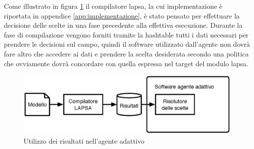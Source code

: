 Come illustrato in figura \ref{fig:lapsa:compiler2} il compilatore \ac{lapsa}, la cui implementazione è riportata in appendice \ref{app:implementazione}, è stato pensato per effettuare la decisione delle scelte in una fase precedente alla effettiva esecuzione. Durante la fase di compilazione vengono forniti tramite la hashtable tutti i dati necessari per prendere le decisioni sul campo, quindi il software utilizzato dall'agente non dovrà fare altro che accedere ai dati e prendere la scelta desiderata secondo una politica che ovviamente dovrà concordare con quella espressa nel target del modulo \ac{lapsa}.

\begin{figure}[htbp!]
	\begin{centering}
		\includegraphics[width=\textwidth]{Images/lapsa2}
	\end{centering}
	\caption{Utilizzo dei risultati nell'agente adattivo}
	\label{fig:lapsa:compiler2}
\end{figure}
